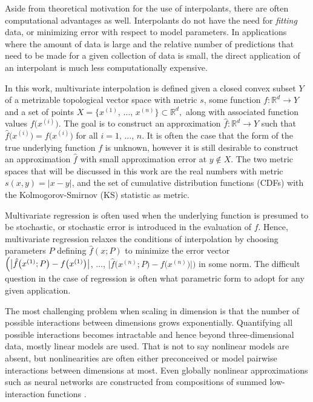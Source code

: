 \documentclass[smallextended,final]{svjour3}       %
\begin{document}
Aside from theoretical motivation for the use of interpolants, there are often computational advantages as well. Interpolants do not have the need for \textit{fitting} data, or minimizing error with respect to model parameters. In applications where the amount of data is large and the relative number of predictions that need to be made for a given collection of data is small, the direct application of an interpolant is much less computationally expensive.

In this work, multivariate interpolation is defined given a closed convex
subset $Y$ of a metrizable topological vector space with metric $s$, some
function $f:\mathbb{R}^d \rightarrow Y$ and a set of points $X =
\bigl\{x^{(1)}$, $\ldots$, $x^{(n)}\bigr\} \subset \mathbb{R}^d,$ along with
associated function values $f\bigl(x^{(i)}\bigr)$. The goal is to construct
an approximation $\hat f: \mathbb{R}^d \rightarrow Y$ such that $\hat
f\bigl(x^{(i)}\bigr) = f\bigl(x^{(i)}\bigr)$ for all $i = 1$, $\ldots$, $n$.
It is often the case that the form of the true underlying function $f$ is
unknown, however it is still desirable to construct an approximation $\hat
f$ with small approximation error at $y \notin X$. The two metric spaces
that will be discussed in this work are the real numbers with metric $s(x,y)
= |x-y|$, and the set of cumulative distribution functions (CDFs) with the
Kolmogorov-Smirnov (KS) statistic as metric.

Multivariate regression is often used when the underlying function is presumed to be stochastic, or stochastic error is introduced in the evaluation of $f$. Hence, multivariate regression relaxes the conditions of interpolation by choosing parameters $P$ defining $\hat f(x;P)$ to minimize the error vector $\Bigl( \bigl | \hat f \bigl(x^{(1)};P\bigr) - f\bigl(x^{(1)}\bigr) \bigr|$, $\ldots$, $\bigl | \hat f \bigl(x^{(n)}; P\bigr) - f\bigl(x^{(n)}\bigr) \bigr | \Bigr)$ in some norm. The difficult question in the case of regression is often what parametric form to adopt for any given application.

The most challenging problem when scaling in dimension is that the number of possible interactions between dimensions grows exponentially. Quantifying all possible interactions becomes intractable and hence beyond three-dimensional data, mostly linear models are used. That is not to say nonlinear models are absent, but nonlinearities are often either preconceived or model pairwise interactions between dimensions at most. Even globally nonlinear approximations such as neural networks are constructed from compositions of summed low-interaction functions \cite{clevert2015fast}.
\end{document}
